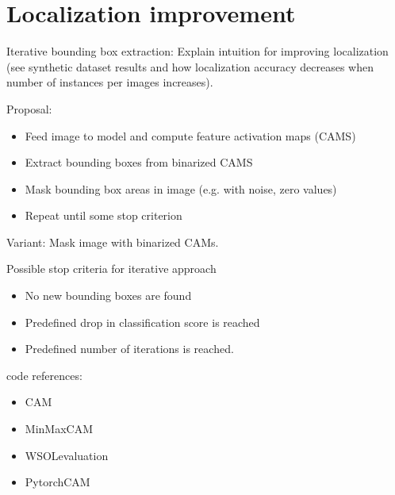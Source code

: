 \section{Localization improvement}
Iterative bounding box extraction: Explain intuition for improving localization (see synthetic dataset results and how localization accuracy decreases when number of instances per images increases).

Proposal:
\begin{itemize}
    \item Feed image to model and compute feature activation maps (CAMS)
    \item Extract bounding boxes from binarized CAMS
    \item Mask bounding box areas in image (e.g. with noise, zero values)
    \item Repeat until some stop criterion
\end{itemize}
Variant: Mask image with binarized CAMs.

Possible stop criteria for iterative approach
\begin{itemize}
    \item No new bounding boxes are found
    \item Predefined drop in classification score is reached
    \item Predefined number of iterations is reached.
\end{itemize}

code references:
\begin{itemize}
    \item CAM \cite{code:CAM}
    \item MinMaxCAM \cite{code:MinMaxCAM}
    \item WSOLevaluation\cite{code:WSOLevaluation}
    \item PytorchCAM \cite{code:PytorchCAM}
\end{itemize}